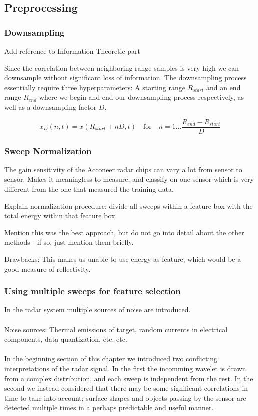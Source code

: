 \documentclass[a4paper, 12pt]{article}
\begin{document}
\subsection{Preprocessing}

\subsubsection{Downsampling}
Add reference to Information Theoretic part

Since the correlation between neighboring range samples is very high we can downsample without significant loss of information. The downsampling process essentially require three hyperparameters: A starting range $R_{start}$ and an end range $R_{end}$ where we begin and end our downsampling process respectively, as well as a downsampling factor $D$.

\begin{equation}
	x_D(n, t) = x(R_{start} + nD, t) \quad \text{for}\quad n=1...\frac{R_{end}-R_{start}}{D}
\end{equation}

\subsubsection{Sweep Normalization}
The gain sensitivity of the Acconeer radar chips can vary a lot from sensor to sensor. Makes it meaningless to measure, and classify on one sensor which is very different from the one that measured the training data. 

Explain normalization procedure: divide all sweeps within a feature box with the total energy within that feature box. 

Mention this was the best approach, but do not go into detail about the other methods - if so, just mention them briefly.

Drawbacks: This makes us unable to use energy as feature, which would be a good measure of reflectivity. 


\subsubsection{Using multiple sweeps for feature selection}

In the radar system multiple sources of noise are introduced.
\\ \\
Noise sources: Thermal emissions of target, random currents in electrical components, data quantization, etc. etc. \citep{w_doerry_2016}
\\ \\
In the beginning section of this chapter we introduced two conflicting interpretations of the radar signal. In the first the incomming wavelet is drawn from a complex distribution, and each sweep is independent from the rest. In the second we instead considered that there may be some significant correlations in time to take into account; surface shapes and objects passing by the sensor are detected multiple times in a perhaps predictable and useful manner.  
\end{document}

